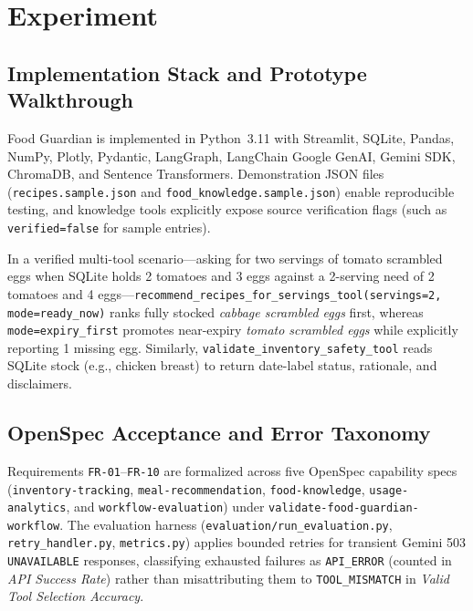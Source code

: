 \section{Experiment}
\label{sec:experiment}

\subsection{Implementation Stack and Prototype Walkthrough}

Food Guardian is implemented in Python~3.11 with Streamlit, SQLite, Pandas, NumPy, Plotly, Pydantic, LangGraph, LangChain Google GenAI, Gemini SDK, ChromaDB, and Sentence Transformers. Demonstration JSON files (\texttt{recipes.sample.json} and \texttt{food\_knowledge.\allowbreak sample.json}) enable reproducible testing, and knowledge tools explicitly expose source verification flags (such as \texttt{verified=false} for sample entries).

In a verified multi-tool scenario---asking for two servings of tomato scrambled eggs when SQLite holds 2 tomatoes and 3 eggs against a 2-serving need of 2 tomatoes and 4 eggs---\texttt{recommend\_recipes\_\allowbreak for\_servings\_tool(servings=2, mode=ready\_now)} ranks fully stocked \textit{cabbage scrambled eggs} first, whereas \texttt{mode=expiry\_first} promotes near-expiry \textit{tomato scrambled eggs} while explicitly reporting 1 missing egg. Similarly, \texttt{validate\_inventory\_\allowbreak safety\_tool} reads SQLite stock (e.g., chicken breast) to return date-label status, rationale, and disclaimers.

\subsection{OpenSpec Acceptance and Error Taxonomy}

Requirements \texttt{FR-01}--\texttt{FR-10} are formalized across five OpenSpec capability specs (\texttt{inventory-tracking}, \texttt{meal-recommendation}, \texttt{food-knowledge}, \texttt{usage-analytics}, and \texttt{workflow-evaluation}) under \texttt{validate-food-\allowbreak guardian-workflow}. The evaluation harness (\texttt{evaluation/\allowbreak run\_evaluation.py}, \texttt{retry\_handler.py}, \texttt{metrics.py}) applies bounded retries for transient Gemini 503 \texttt{UNAVAILABLE} responses, classifying exhausted failures as \texttt{API\_ERROR} (counted in \textit{API Success Rate}) rather than misattributing them to \texttt{TOOL\_MISMATCH} in \textit{Valid Tool Selection Accuracy}.

